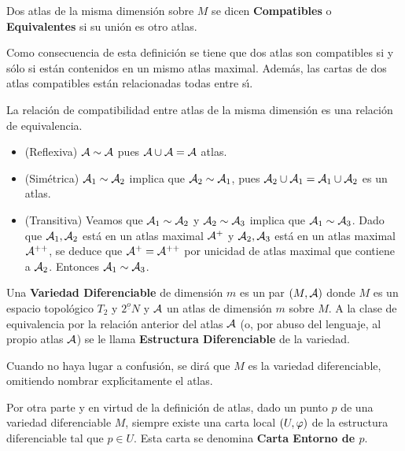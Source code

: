 \documentclass[cursovd_portada.tex]{subfiles}
\begin{document}
\begin{defi}
Dos atlas de la misma dimensi\'{o}n sobre $M$ se dicen {\bf Compatibles} o {\bf Equivalentes} si su uni\'{o}n es otro
atlas.
\end{defi}
Como consecuencia de esta definici\'{o}n se tiene que dos atlas
son compatibles si y s\'olo si est\'{a}n contenidos en un mismo
atlas maximal. Adem\'{a}s, las cartas de dos atlas compatibles
est\'{a}n relacionadas todas entre s\'{\i}.
\begin{prop}
La relaci\'{o}n de compatibilidad entre atlas de la misma dimensi\'{o}n es una relaci\'{o}n de equivalencia.
\end{prop}

\begin{dem}\mbox{}
\begin{itemize}
	\item (Reflexiva) ${\mathcal{A}} \sim {\mathcal{A}}$ pues ${\mathcal{A}} \cup {\mathcal{A}} = {\mathcal{A}}$ atlas.
	\item (Simétrica) ${\mathcal{A}}_1 \sim {\mathcal{A}}_2$ implica que ${\mathcal{A}}_2 \sim {\mathcal{A}}_1$, pues ${\mathcal{A}}_2 \cup {\mathcal{A}}_1 = {\mathcal{A}}_1 \cup {\mathcal{A}}_2$ es un atlas.
	\item (Transitiva) Veamos que ${\mathcal{A}}_1 \sim {\mathcal{A}}_2$ y ${\mathcal{A}}_2 \sim {\mathcal{A}}_3$ implica que ${\mathcal{A}}_1 \sim {\mathcal{A}}_3$. Dado que ${\mathcal{A}}_1,{\mathcal{A}}_2$ está en un atlas maximal ${\mathcal{A}}^+$ y ${\mathcal{A}}_2,{\mathcal{A}}_3$ está en un atlas maximal ${\mathcal{A}}^{++}$, se deduce que ${\mathcal{A}}^+={\mathcal{A}}^{++}$ por unicidad de atlas maximal que contiene a ${\mathcal{A}}_2$. Entonces ${\mathcal{A}}_1 \sim {\mathcal{A}}_3$.
\end{itemize}
\end{dem}

\begin{defi} Una {\bf Variedad Diferenciable} de dimensi\'{o}n $m$ es un par $(M,{\cal A})$ donde $M$ es un espacio
topol\'{o}gico $T_2$ y $2^{\underline{o}}N$ y ${\cal A}$ un atlas de dimensi\'{o}n $m$ sobre $M$. A la clase de
equivalencia por la relaci\'{o}n anterior del atlas ${\cal A}$ (o, por abuso del lenguaje, al propio atlas ${\cal A}$)
se le llama {\bf Estructura Diferenciable} de la variedad.
\end{defi}
Cuando no haya lugar a confusi\'{o}n, se dir\'{a} que $M$ es la variedad diferenciable, omitiendo nombrar expl\'{\i}citamente
el atlas.
\par
Por otra parte y en virtud de la definici\'{o}n de atlas, dado un punto $p$ de una variedad diferenciable $M$, siempre
existe una carta local $(U,\varphi)$ de la estructura diferenciable tal que $p\in U$. Esta carta se denomina {\bf
Carta Entorno de $p$}.

\newpage
\end{document}
